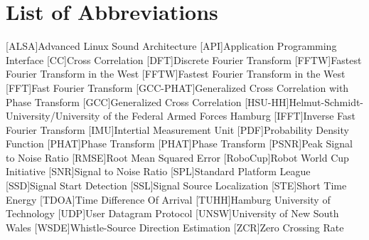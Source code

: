 \chapter*{List of Abbreviations}
\label{sec:abbreviations}

\begin{acronym}\itemsep0pt
  [ALSA]{Advanced Linux Sound Architecture}
  [API]{Application Programming Interface}
  [CC]{Cross Correlation}
  [DFT]{Discrete Fourier Transform}
  [FFTW]{Fastest Fourier Transform in the West}
  [FFTW]{Fastest Fourier Transform in the West}
  [FFT]{Fast Fourier Transform}
  [GCC-PHAT]{Generalized Cross Correlation with Phase Transform}
  [GCC]{Generalized Cross Correlation}
  [HSU-HH]{Helmut-Schmidt-University/University of the Federal Armed Forces Hamburg}
  [IFFT]{Inverse Fast Fourier Transform}
  [IMU]{Intertial Measurement Unit}
  [PDF]{Probability Density Function}
  [PHAT]{Phase Transform}
  [PHAT]{Phase Transform}
  [PSNR]{Peak Signal to Noise Ratio}
  [RMSE]{Root Mean Squared Error}
  [RoboCup]{Robot World Cup Initiative}
  [SNR]{Signal to Noise Ratio}
  [SPL]{Standard Platform League}
  [SSD]{Signal Start Detection}
  [SSL]{Signal Source Localization}
  [STE]{Short Time Energy}
  [TDOA]{Time Difference Of Arrival}
  [TUHH]{Hamburg University of Technology}
  [UDP]{User Datagram Protocol}
  [UNSW]{University of New South Wales}
  [WSDE]{Whistle-Source Direction Estimation}
  [ZCR]{Zero Crossing Rate}
\end{acronym}
